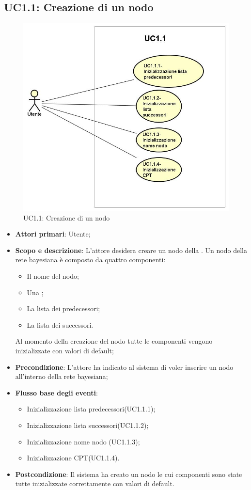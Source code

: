 \subsection{UC1.1: Creazione di un nodo}
\hypertarget{UC1.1}{}  
\begin{figure} [H]
	\centering
	\includegraphics[scale=0.45]{Img/UC1-1} 
	\caption{UC1.1: Creazione di un nodo} \label{} 
\end{figure} 
\begin{itemize} 
	\item{\textbf{Attori primari}: Utente;} 
	\item{\textbf{Scopo e descrizione}: L'attore desidera creare un nodo della . Un nodo della rete bayesiana è composto da quattro componenti: 
		\begin{itemize} 
			\item{Il nome del nodo;} 
			\item{Una ;} 
			\item{La lista dei predecessori;} 
			\item{La lista dei successori.} 
		\end{itemize} 
		Al momento della creazione del nodo tutte le componenti vengono inizializzate con valori di default;} 
	\item{\textbf{Precondizione}: L'attore ha indicato al sistema di voler inserire un nodo all'interno della rete bayesiana;} 
	\item{\textbf{Flusso base degli eventi}: } 
	\begin{itemize} 
		\item{Inizializzazione lista predecessori(UC1.1.1);} 
		\item{Inizializzazione lista successori(UC1.1.2);} 
		\item{Inizializzazione nome nodo (UC1.1.3);} 
		\item{Inizializzazione CPT(UC1.1.4).} 
	\end{itemize} 
	\item{\textbf{Postcondizione}: Il sistema ha creato un nodo le cui componenti sono state tutte inizializzate correttamente con valori di default.} 
\end{itemize} 
